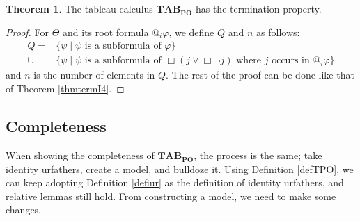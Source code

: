 \documentclass{article}
\theoremstyle{definition}
\newtheorem{theorem}[definition]{Theorem}
\newcommand{\tableauPO}{\mathbf{TAB}_{\textbf{PO}}}
\begin{document}
\begin{theorem}
    The tableau calculus $\tableauPO$ has the termination property.
    \label{thmtermPO}
\end{theorem}
\begin{proof}
    For $\Theta$ and its root formula $@_i \varphi$, we define $Q$ and $n$ as follows:
    \begin{align*}
        Q = &\{ \psi \mid \psi \text{ is a subformula of } \varphi \} \\
        \cup &\{ \psi \mid \psi \text{ is a subformula of } \Box (j \lor \Box \neg j) \text{ where } j \text{ occurs in } @_i \varphi \}
    \end{align*}
    and $n$ is the number of elements in $Q$. The rest of the proof can be done like that of Theorem \ref{thmtermI4}.
\end{proof}

\subsection{Completeness}

When showing the completeness of $\tableauPO$, the process is the same; take identity urfathers, create a model, and bulldoze it. Using Definition \ref{defTPO}, we can keep adopting Definition \ref{defiur} as the definition of identity urfathers, and relative lemmas still hold. From constructing a model, we need to make some changes.
\end{document}
